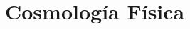 \documentclass{tufte-handout}
\newcommand{\doccmd}[1]{\texttt{\textbackslash#1}}%
\newcommand{\docopt}[1]{\ensuremath{\langle}\textrm{\textit{#1}}\ensuremath{\rangle}}%
\newcommand{\docarg}[1]{\textrm{\textit{#1}}}%
\newenvironment{docspec}{\begin{quote}\noindent}{\end{quote}}%
\begin{document}
\clearpage

\section{Cosmología Física}

\clearpage





\end{document}
